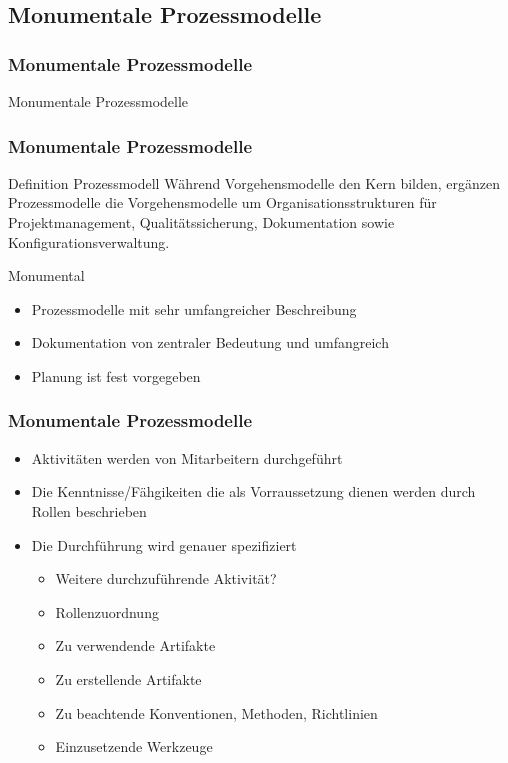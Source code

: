 \subsection{Monumentale Prozessmodelle}
\begin{frame}
\frametitle{Monumentale Prozessmodelle}
\huge Monumentale Prozessmodelle
\end{frame}

\begin{frame}
\frametitle{Monumentale Prozessmodelle}
	\begin{block}{Definition Prozessmodell}
		Während Vorgehensmodelle den Kern bilden, ergänzen Prozessmodelle die Vorgehensmodelle um
		Organisationsstrukturen für Projektmanagement, Qualitätssicherung, Dokumentation sowie
		Konfigurationsverwaltung.
	\end{block}
	\bigskip
	\begin{block}{Monumental}
		\begin{itemize}
			\item Prozessmodelle mit sehr umfangreicher Beschreibung
			\item Dokumentation von zentraler Bedeutung und umfangreich
			\item Planung ist fest vorgegeben
		\end{itemize}
  \end{block}
\end{frame}

\begin{frame}
\frametitle{Monumentale Prozessmodelle}
	\begin{itemize}
		\item Aktivitäten werden von Mitarbeitern durchgeführt
		\item Die Kenntnisse/Fähgikeiten die als Vorraussetzung dienen
		werden durch Rollen beschrieben
		\item Die Durchführung wird genauer spezifiziert
		\begin{itemize}
			\item Weitere durchzuführende Aktivität?
			\item Rollenzuordnung
			\item Zu verwendende Artifakte
			\item Zu erstellende Artifakte
			\item Zu beachtende Konventionen, Methoden, Richtlinien
			\item Einzusetzende Werkzeuge
		\end{itemize}
	\end{itemize}
\end{frame}

